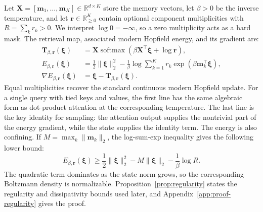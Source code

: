 Let $\mathbf X=[\mathbf m_1,\ldots,\mathbf m_K]\in\mathbb R^{d\times K}$
store the memory vectors, let $\beta>0$ be the inverse temperature, and let
$\mathbf r\in\mathbb R_{\geq0}^K$ contain optional component multiplicities
with $R=\sum_k r_k>0$. We interpret $\log 0=-\infty$, so a zero multiplicity
acts as a hard mask. The retrieval map, associated modern Hopfield energy, and
its gradient are:
\begin{align}
\mathbf T_{\beta,\mathbf r}(\boldsymbol\xi)
&=\mathbf X\operatorname{softmax}\!\left(
\beta\mathbf X^\top\boldsymbol\xi+\log\mathbf r\right),
\label{eq:hopfield-update}\\
E_{\beta,\mathbf r}(\boldsymbol\xi)
&=\frac12\lVert\boldsymbol\xi\rVert_2^2
-\frac1\beta\log\sum_{k=1}^K
r_k\exp\!\left(\beta\mathbf m_k^\top\boldsymbol\xi\right),
\label{eq:modern-hopfield-energy}\\
\nabla E_{\beta,\mathbf r}(\boldsymbol\xi)
&=\boldsymbol\xi-\mathbf T_{\beta,\mathbf r}(\boldsymbol\xi).
\label{eq:energy-gradient}
\end{align}
Equal multiplicities recover the standard continuous modern Hopfield update.
For a single query with tied keys and values, the first line has the same
algebraic form as dot-product attention at the corresponding temperature. The
last line is the key identity for sampling: the attention output supplies the
nontrivial part of the energy gradient, while the state supplies the identity
term. The energy is also confining. If
$M=\max_k\lVert\mathbf m_k\rVert_2$, the log-sum-exp inequality gives the
following lower bound:
\begin{equation}
E_{\beta,\mathbf r}(\boldsymbol\xi)
\geq \frac12\lVert\boldsymbol\xi\rVert_2^2
-M\lVert\boldsymbol\xi\rVert_2-\frac1\beta\log R.
\label{eq:energy-lower-bound}
\end{equation}
The quadratic term dominates as the state norm grows, so the corresponding
Boltzmann density is normalizable. Proposition~\ref{prop:regularity} states the
regularity and dissipativity bounds used later, and
Appendix~\ref{app:proof-regularity} gives the proof.

